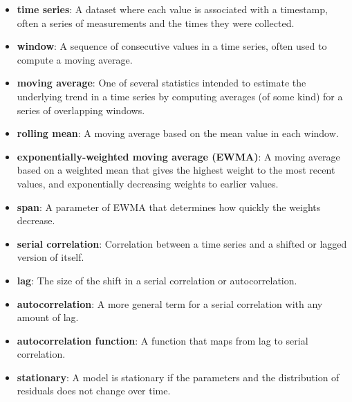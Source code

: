 \documentclass[12pt]{book}
\begin{document}
\begin{itemize}

\item {\bf time series}: A dataset where each value is associated with
a timestamp, often a series of measurements and the times they
were collected.

\item {\bf window}: A sequence of consecutive values in a time series,
often used to compute a moving average.

\item {\bf moving average}: One of several statistics intended to estimate
the underlying trend in a time series by computing averages (of
some kind) for a series of overlapping windows.

\item {\bf rolling mean}: A moving average based on the mean value in
each window.

\item {\bf exponentially-weighted moving average (EWMA)}: A moving
average based on a weighted mean that gives the highest weight
to the most recent values, and exponentially decreasing weights
to earlier values.  

\item {\bf span}: A parameter of EWMA that determines how quickly the
weights decrease.

\item {\bf serial correlation}: Correlation between a time series and
a shifted or lagged version of itself.

\item {\bf lag}: The size of the shift in a serial correlation or
autocorrelation.

\item {\bf autocorrelation}: A more general term for a serial correlation
with any amount of lag.

\item {\bf autocorrelation function}: A function that maps from lag to
serial correlation.

\item {\bf stationary}: A model is stationary if the parameters and the
distribution of residuals does not change over time.

\end{itemize}
\end{document}
